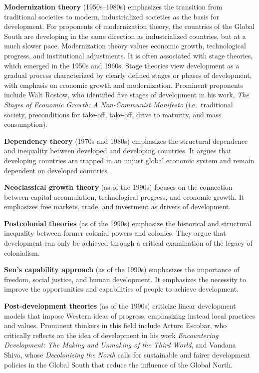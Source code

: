 \documentclass[
  a4paper,
  DIV=11,
  numbers=noendperiod,
  oneside,
  openany]{scrreprt}
\begin{document}
\endgroup{}

\begin{tcolorbox}[enhanced jigsaw, arc=.35mm, bottomrule=.15mm, bottomtitle=1mm, breakable, colback=white, colbacktitle=quarto-callout-note-color!10!white, colframe=quarto-callout-note-color-frame, coltitle=black, left=2mm, leftrule=.75mm, opacityback=0, opacitybacktitle=0.6, rightrule=.15mm, title={Development theories}, titlerule=0mm, toprule=.15mm, toptitle=1mm]

\textbf{Modernization theory} (1950s--1980s) emphasizes the transition
from traditional societies to modern, industrialized societies as the
basis for development. For proponents of modernization theory, the
countries of the Global South are developing in the same direction as
industrialized countries, but at a much slower pace. Modernization
theory values economic growth, technological progress, and institutional
adjustments. It is often associated with stage theories, which emerged
in the 1950s and 1960s. Stage theories view development as a gradual
process characterized by clearly defined stages or phases of
development, with emphasis on economic growth and modernization.
Prominent proponents include Walt Rostow, who identified five stages of
development in his work, \emph{The Stages of Economic Growth: A
Non-Communist Manifesto} (i.e.~traditional society, preconditions for
take-off, take-off, drive to maturity, and mass consumption).

\textbf{Dependency theory} (1970s and 1980s) emphasizes the structural
dependence and inequality between developed and developing countries. It
argues that developing countries are trapped in an unjust global
economic system and remain dependent on developed countries.

\textbf{Neoclassical growth theory} (as of the 1990s) focuses on the
connection between capital accumulation, technological progress, and
economic growth. It emphasizes free markets, trade, and investment as
drivers of development.

\textbf{Postcolonial theories} (as of the 1990s) emphasize the
historical and structural inequality between former colonial powers and
colonies. They argue that development can only be achieved through a
critical examination of the legacy of colonialism.

\textbf{Sen's capability approach} (as of the 1990s) emphasizes the
importance of freedom, social justice, and human development. It
emphasizes the necessity to improve the opportunities and capabilities
of people to achieve development.

\textbf{Post-development theories} (as of the 1990s) criticize linear
development models that impose Western ideas of progress, emphasizing
instead local practices and values. Prominent thinkers in this field
include Arturo Escobar, who critically reflects on the idea of
development in his work \emph{Encountering Development: The Making and
Unmaking of the Third World}, and Vandana Shiva, whose
\emph{Decolonizing the North} calls for sustainable and fairer
development policies in the Global South that reduce the influence of
the Global North.

\end{tcolorbox}
\end{document}
